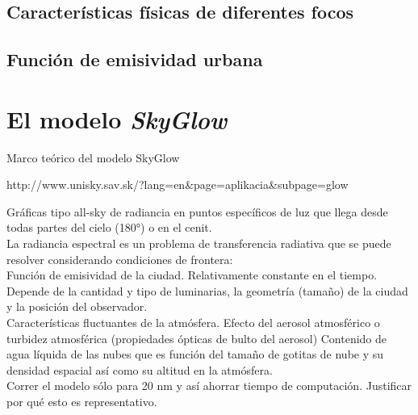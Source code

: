 \subsection{Características físicas de diferentes focos}
\subsection{Función de emisividad urbana}

\section{El modelo \textit{SkyGlow}}

Marco teórico del modelo SkyGlow

http://www.unisky.sav.sk/?lang=en&page=aplikacia&subpage=glow

Gráficas tipo all-sky de radiancia en puntos específicos de luz que llega desde todas partes del cielo (180°) o en el cenit.\\

La radiancia espectral es un problema de transferencia radiativa que se puede resolver considerando condiciones de frontera:\\

Función de emisividad de la ciudad. Relativamente constante en el tiempo. Depende de la cantidad y tipo de luminarias, la geometría (tamaño) de la ciudad y la posición del observador.\\

Características fluctuantes de la atmósfera. 
Efecto del aerosol atmosférico o turbidez atmosférica (propiedades ópticas de bulto del aerosol)
Contenido de agua líquida de las nubes que es función del tamaño de gotitas de nube y su densidad espacial así como su altitud en la atmósfera.\\

Correr el modelo sólo para 20 nm y así ahorrar tiempo de computación. Justificar por qué esto es representativo.